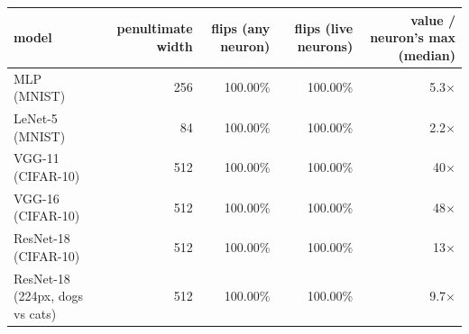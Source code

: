 \begin{tabular}{lrrrr}
\toprule
model & penultimate width & flips (any neuron) & flips (live neurons) & value / neuron's max (median) \\
\midrule
MLP (MNIST) & 256 & 100.00\% & 100.00\% & 5.3$\times$ \\
LeNet-5 (MNIST) & 84 & 100.00\% & 100.00\% & 2.2$\times$ \\
VGG-11 (CIFAR-10) & 512 & 100.00\% & 100.00\% & 40$\times$ \\
VGG-16 (CIFAR-10) & 512 & 100.00\% & 100.00\% & 48$\times$ \\
ResNet-18 (CIFAR-10) & 512 & 100.00\% & 100.00\% & 13$\times$ \\
ResNet-18 (224px, dogs vs cats) & 512 & 100.00\% & 100.00\% & 9.7$\times$ \\
\bottomrule
\end{tabular}

